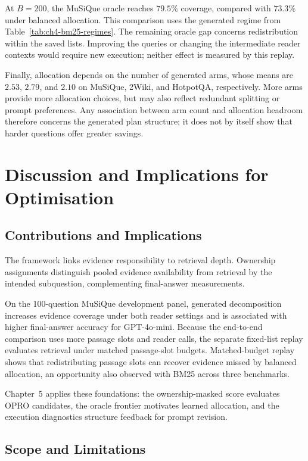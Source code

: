 At $B=200$, the MuSiQue oracle reaches $79.5\%$ coverage, compared with
$73.3\%$ under balanced allocation. This comparison uses the generated
regime from Table~\ref{tab:ch4-bm25-regimes}. The remaining oracle gap
concerns redistribution within the saved lists. Improving the queries or
changing the intermediate reader contexts would require new execution;
neither effect is measured by this replay.

Finally, allocation depends on the number of generated arms,
whose means are $2.53$, $2.79$, and $2.10$ on MuSiQue, 2Wiki,
and HotpotQA, respectively. More arms provide more allocation
choices, but may also reflect redundant splitting or prompt
preferences. Any association between arm count and allocation
headroom therefore concerns the generated plan structure;
it does not by itself show that harder questions offer
greater savings.

\section{Discussion and Implications for Optimisation}
\label{sec:ch4-discussion}

\subsection{Contributions and Implications}

The framework links evidence responsibility to retrieval depth. Ownership
assignments distinguish pooled evidence availability from retrieval by the
intended subquestion, complementing final-answer measurements.

On the 100-question MuSiQue development panel, generated decomposition increases 
evidence coverage under both reader settings and is associated with higher 
final-answer accuracy for GPT-4o-mini. Because the end-to-end comparison uses 
more passage slots and reader calls, the separate fixed-list replay evaluates 
retrieval under matched passage-slot budgets. Matched-budget replay shows that redistributing passage
slots can recover evidence missed by balanced allocation, an opportunity
also observed with BM25 across three benchmarks.

Chapter~5 applies these foundations: the ownership-masked score evaluates
OPRO candidates, the oracle frontier motivates learned allocation, and the
execution diagnostics structure feedback for prompt revision.

\subsection{Scope and Limitations}
\label{sec:ch4-limitations}

